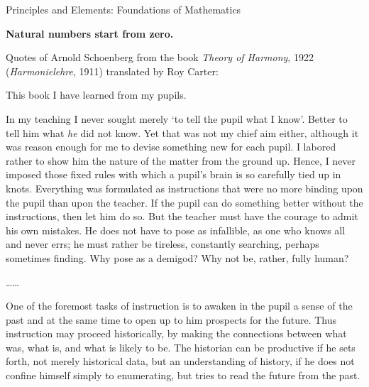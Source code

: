 \documentclass[oneside,12pt]{article}
\begin{document}
\abovedisplayskip=3pt
\abovedisplayskip

\leavevmode

{\centering
Principles and Elements: Foundations of Mathematics

}

\leavevmode

\hspace{-0.75in} \textbf{Natural numbers start from zero.}

\leavevmode

Quotes of Arnold Schoenberg from the book \emph{Theory of Harmony}, 1922 (\emph{Harmonielehre}, 1911) translated by Roy Carter:

\begin{mdframed}

This book I have learned from my pupils.

In my teaching I never sought merely `to tell the pupil what I know'. Better to tell him what \emph{he} did not know. Yet that was not my chief aim either, although it was reason enough for me to devise something new for each pupil. I labored rather to show him the nature of the matter from the ground up. Hence, I never imposed those fixed rules with which a pupil's brain is so carefully tied up in knots. Everything was formulated as instructions that were no more binding upon the pupil than upon the teacher. If the pupil can do something better without the instructions, then let him do so. But the teacher must have the courage to admit his own mistakes. He does not have to pose as infallible, as one who knows all and never errs; he must rather be tireless, constantly searching, perhaps sometimes finding. Why pose as a demigod? Why not be, rather, fully human?

\ldots\ldots{}

One of the foremost tasks of instruction is to awaken in the pupil a sense of the past and at the same time to open up to him prospects for the future. Thus instruction may proceed historically, by making the connections between what was, what is, and what is likely to be. The historian can be productive if he sets forth, not merely historical data, but an understanding of history, if he does not confine himself simply to enumerating, but tries to read the future from the past.


\end{mdframed}
\end{document}
